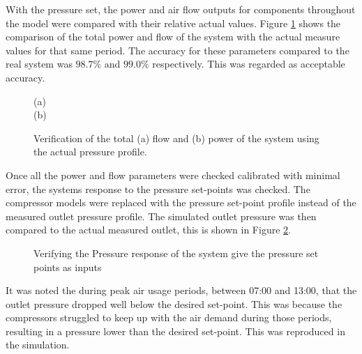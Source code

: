  	With the pressure set, the power and air flow outputs for components throughout the model were compared with their relative actual values. Figure \ref{fig: Verification Power kusasalethu} shows the comparison of the total power and flow of the system with the actual measure values for that same period. The accuracy for these parameters compared to the real system was $98.7 \%$ and $99.0 \%$ respectively. This was regarded as acceptable accuracy. 
 
	\begin{figure}[h]
		\centering
		\fbox{}
		(a)\\
		\fbox{}
		(b)\\
		\caption{Verification of the total (a) flow and (b) power of the system using the actual pressure profile.}
		\label{fig: Verification Power kusasalethu}
	\end{figure}

	Once all the power and flow parameters were checked calibrated with minimal error, the systems response to the pressure set-points was checked. The compressor models were replaced with the pressure set-point profile instead of the measured outlet pressure profile. The simulated outlet pressure was then compared to the actual measured outlet, this is shown in Figure \ref{fig: Verification Pressure kusasalethu Setpoint}.

	\begin{figure}[h]
		\centering
		\fbox{}
		\caption{Verifying the Pressure response of the system give the pressure set points as inputs}
		\label{fig: Verification Pressure kusasalethu Setpoint}
	\end{figure}
	\par 
	It was noted the during peak air usage periods, between 07:00 and 13:00, that the outlet pressure dropped well below the desired set-point. This was because the compressors struggled to keep up with the air demand during those periods, resulting in a pressure lower than the desired set-point. This was reproduced in the simulation.
